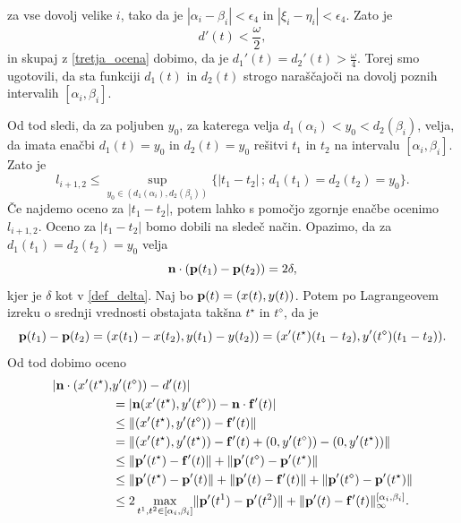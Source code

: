 za vse dovolj velike $i$, tako da je $|\alpha _i-\beta _i| < \epsilon _4$ in $|\xi _i - \eta _i| < \epsilon _4$. Zato je 
\begin{equation}\label{ocena_omega}
d'(t)<\frac{\omega}{2},
\end{equation}
 in skupaj z \ref{tretja_ocena} dobimo, da je $d_1'(t) = d_2'(t) > \frac{\omega}{4}$. Torej smo ugotovili, da sta funkciji $d_1(t)$ in $d_2(t)$ strogo naraščajoči na dovolj poznih intervalih $[\alpha _i, \beta _i]$.

Od tod sledi, da za poljuben $y_0$, za katerega velja $d_1(\alpha _i) < y_0 < d_2(\beta _i)$, velja, da imata enačbi $d_1(t)=y_0$ in $d_2(t) = y_0$ rešitvi $t_1$ in $t_2$ na intervalu $[\alpha _i, \beta _i]$. Zato je
\begin{equation}\label{lp2}
l_{i+1, 2} \leq \sup _{y_0\in (d_1(\alpha _i), d_2(\beta _i))} \{ |t_1-t_2|\, ; \, d_1(t_1)=d_2(t_2)=y_0\}.
\end{equation}
Če najdemo oceno za $|t_1-t_2|$, potem lahko s pomočjo zgornje enačbe ocenimo $l_{i+1,2}$. Oceno za $|t_1-t_2|$ bomo dobili na sledeč način. 
Opazimo, da za $d_1(t_1) = d_2(t_2) = y_0$ velja
$$
{\bf n}\cdot ({\bf p} (t_1) - {\bf p}(t_2)) = 2\delta,
$$
kjer je $\delta$ kot v \ref{def_delta}. Naj bo ${\bf p}(t)=(x(t),y(t))$. Potem po Lagrangeovem izreku o srednji vrednosti obstajata takšna $t^{\star}$ in $t^{\diamond}$, da je
$$
{\bf p}(t_1) - {\bf p}(t_2) = (x(t_1) - x(t_2), y(t_1) - y(t_2)) = (x'(t^{\star})(t_1-t_2),y'(t^{\diamond})(t_1-t_2)).
$$
Od tod dobimo oceno
\begin{equation*}
\begin{split}
|{\bf n}\cdot(x'(t^{\star}), &y'(t^\diamond)) - d'(t)|  \\
& = |{\bf n} (x'(t^\star), y'(t^\diamond)) - {\bf n}\cdot {\bf f}'(t) | \\
& \leq \lVert (x'(t^\star), y'(t^\diamond)) - {\bf f}'(t)\rVert \\
& = \lVert (x'(t^\star),y'(t^\star)) - {\bf f}'(t) + (0, y'(t^\diamond)) - (0,y'(t^\star))\rVert \\
& \leq \lVert {\bf p}'(t^\star) - {\bf f}'(t)\rVert + \lVert {\bf p}'(t^\diamond) - {\bf p}'(t^\star)\rVert \\ 
& \leq \lVert {\bf p}'(t^\star) - {\bf p}'(t)\rVert + \lVert {\bf p}'(t) - {\bf f}'(t)\rVert + 
\lVert {\bf p}'(t^\diamond) - {\bf p}'(t^\star)\rVert \\
& \leq 2\max _{t^1,t^2\in [\alpha _i,\beta _i]} \lVert {\bf p}'(t^1) - {\bf p}'(t^2)\rVert + 
\lVert {\bf p}'(t) - {\bf f}'(t)\rVert _{\infty}^{[\alpha _i,\beta _i]}.
\end{split}
\end{equation*}
